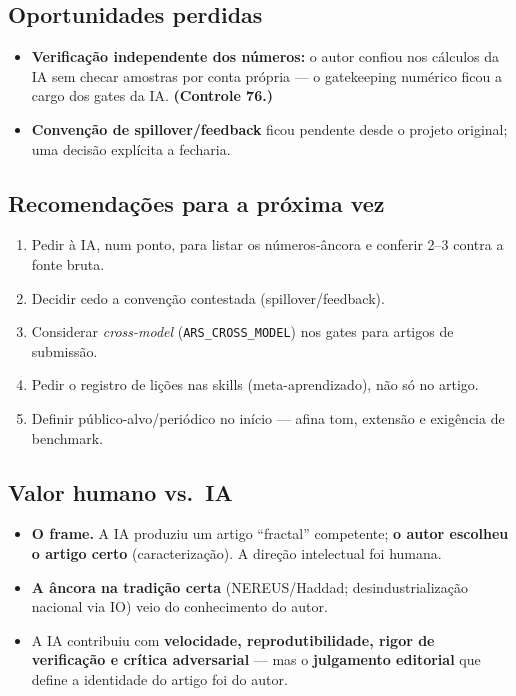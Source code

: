 \documentclass[12pt,a4paper]{article}
\begin{document}
\subsection*{Oportunidades perdidas}
\begin{itemize}\setlength\itemsep{1pt}
\item \textbf{Verificação independente dos números:} o autor confiou nos cálculos da IA sem checar
  amostras por conta própria — o gatekeeping numérico ficou a cargo dos gates da IA. \textbf{(Controle 76.)}
\item \textbf{Convenção de spillover/feedback} ficou pendente desde o projeto original; uma decisão
  explícita a fecharia.
\end{itemize}

\subsection*{Recomendações para a próxima vez}
\begin{enumerate}\setlength\itemsep{1pt}
\item Pedir à IA, num ponto, para listar os números-âncora e conferir 2--3 contra a fonte bruta.
\item Decidir cedo a convenção contestada (spillover/feedback).
\item Considerar \emph{cross-model} (\texttt{ARS\_CROSS\_MODEL}) nos gates para artigos de submissão.
\item Pedir o registro de lições nas skills (meta-aprendizado), não só no artigo.
\item Definir público-alvo/periódico no início — afina tom, extensão e exigência de benchmark.
\end{enumerate}

\subsection*{Valor humano vs.\ IA}
\begin{itemize}\setlength\itemsep{1pt}
\item \textbf{O frame.} A IA produziu um artigo ``fractal'' competente; \textbf{o autor escolheu o artigo
  certo} (caracterização). A direção intelectual foi humana.
\item \textbf{A âncora na tradição certa} (NEREUS/Haddad; desindustrialização nacional via IO) veio do
  conhecimento do autor.
\item A IA contribuiu com \textbf{velocidade, reprodutibilidade, rigor de verificação e crítica
  adversarial} — mas o \textbf{julgamento editorial} que define a identidade do artigo foi do autor.
\end{itemize}
\end{document}
